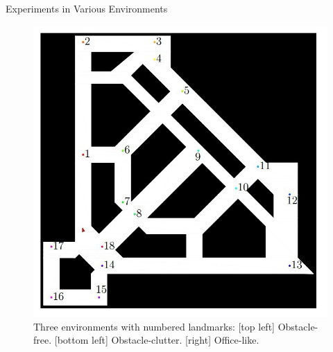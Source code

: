 \begin{frame}{Experiments in Various Environments}
\begin{figure}
\begin{minipage}[b]{0.45\textwidth}
  \end{minipage}
  \begin{minipage}[b]{0.45\textwidth}
    \includegraphics[scale=0.45]{figs/office}    
  \end{minipage}
  \caption{\scriptsize{Three environments with numbered landmarks: [top left]
    Obstacle-free. [bottom left] Obstacle-clutter. [right] Office-like.}}
  \label{fig:env}
\end{figure}
\end{frame}



